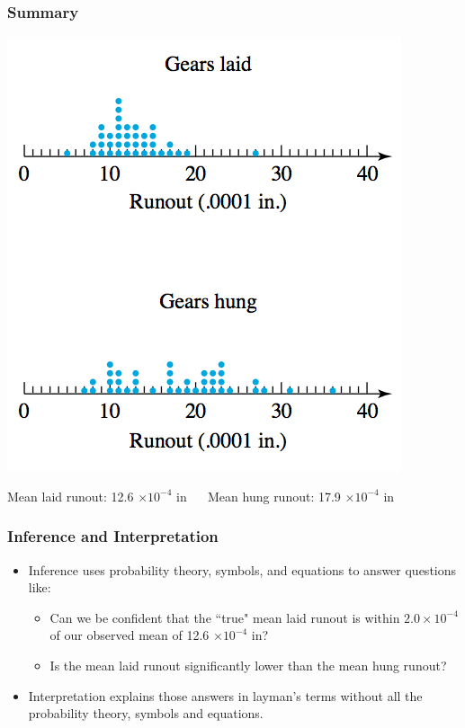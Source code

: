 \documentclass[handout]{beamer}\usepackage{graphicx, color}
\providecommand{\q}{$\quad$ \newline}
\numberwithin{equation}{section}
\begin{document}
\begin{frame}
\frametitle{Summary}
\begin{center}
 \includegraphics{../../fig/gearsdot.png} 
\end{center}

Mean laid runout: 12.6 $\times 10^{-4}$ in \q
Mean hung runout: 17.9  $\times 10^{-4}$ in
\end{frame}


\begin{frame}
\frametitle{Inference and Interpretation}
\begin{itemize}
\item Inference uses probability theory, symbols, and equations to answer questions like:
\begin{itemize}
\item Can we be confident that the ``true" mean laid runout is within $2.0 \times 10^{-4}$ of our observed mean of 12.6 $\times 10^{-4}$ in? \pause
\item Is the mean laid runout significantly lower than the mean hung runout? 
\end{itemize} \pause
\item Interpretation explains those answers in layman's terms without all the probability theory, symbols and equations.
\end{itemize}
\end{frame}
\end{document}
